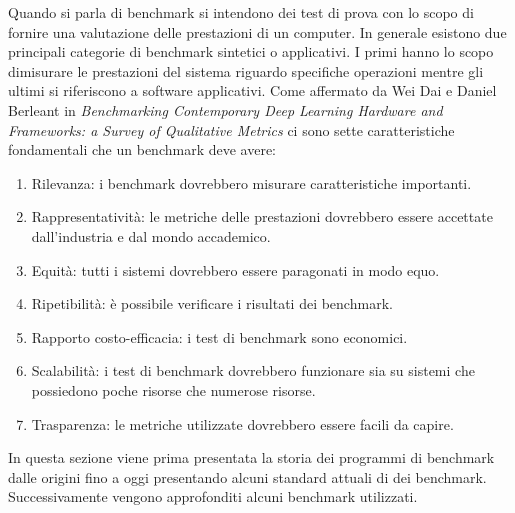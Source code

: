 \documentclass[12pt,a4paper]{report}
\begin{document}
Quando si parla di benchmark si intendono dei test di prova con lo scopo di fornire una valutazione delle prestazioni di un computer. In generale esistono due principali categorie di benchmark sintetici o applicativi. I primi hanno lo scopo dimisurare le prestazioni del sistema riguardo specifiche operazioni mentre gli ultimi si riferiscono a software applicativi. Come affermato da Wei Dai e Daniel Berleant in \textit{Benchmarking Contemporary Deep Learning Hardware and Frameworks: a Survey  of Qualitative Metrics }\cite{benchmarkIntro} ci sono sette caratteristiche fondamentali che un benchmark deve avere:
\begin{enumerate}
    \item Rilevanza: i benchmark dovrebbero misurare caratteristiche importanti.
  \item Rappresentatività: le metriche delle prestazioni  dovrebbero essere accettate dall'industria e dal mondo accademico.
  \item Equità: tutti i sistemi dovrebbero essere paragonati in modo equo.
  \item Ripetibilità: è possibile verificare i risultati dei benchmark.
  \item Rapporto costo-efficacia: i test di benchmark sono economici.
  \item Scalabilità: i test di benchmark dovrebbero funzionare sia su sistemi che possiedono poche risorse che numerose risorse.
  \item Trasparenza: le metriche utilizzate dovrebbero essere facili da capire.
\end{enumerate}
In questa sezione viene prima presentata la storia dei programmi di benchmark dalle origini fino a oggi presentando alcuni standard attuali di  dei benchmark. Successivamente vengono approfonditi alcuni benchmark utilizzati.

 
\end{document}
